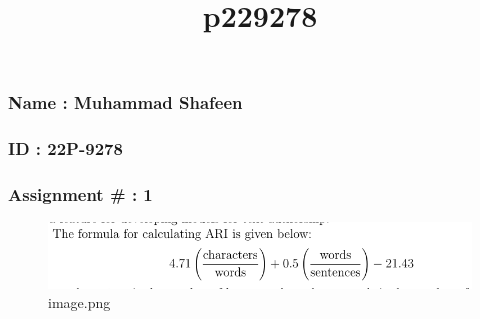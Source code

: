 \documentclass[11pt]{article}
\title{p229278}
\begin{document}
    
    \maketitle
    
    

    
    \hypertarget{name-muhammad-shafeen}{%
\subsubsection{Name : Muhammad Shafeen}\label{name-muhammad-shafeen}}

\hypertarget{id-22p-9278}{%
\subsubsection{ID : 22P-9278}\label{id-22p-9278}}

\hypertarget{assignment-1}{%
\subsubsection{Assignment \# : 1}\label{assignment-1}}

    \begin{figure}
\centering
\includegraphics{p229278_files/image.png}
\caption{image.png}
\end{figure}
\end{document}
